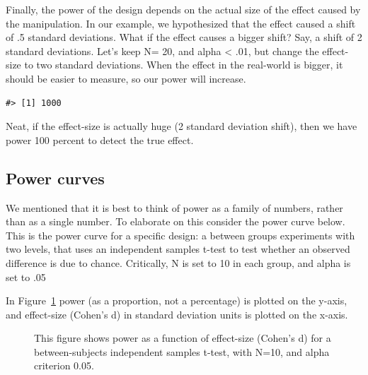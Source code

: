 \documentclass[
  letterpaper,
  DIV=11,
  numbers=noendperiod]{scrreprt}
\begin{document}
Finally, the power of the design depends on the actual size of the
effect caused by the manipulation. In our example, we hypothesized that
the effect caused a shift of .5 standard deviations. What if the effect
causes a bigger shift? Say, a shift of 2 standard deviations. Let's keep
N= 20, and alpha \textless{} .01, but change the effect-size to two
standard deviations. When the effect in the real-world is bigger, it
should be easier to measure, so our power will increase.

\begin{verbatim}
#> [1] 1000
\end{verbatim}

Neat, if the effect-size is actually huge (2 standard deviation shift),
then we have power 100 percent to detect the true effect.

\subsection{Power curves}\label{power-curves-1}

We mentioned that it is best to think of power as a family of numbers,
rather than as a single number. To elaborate on this consider the power
curve below. This is the power curve for a specific design: a between
groups experiments with two levels, that uses an independent samples
t-test to test whether an observed difference is due to chance.
Critically, N is set to 10 in each group, and alpha is set to .05

In Figure~\ref{fig-13powercurve} power (as a proportion, not a
percentage) is plotted on the y-axis, and effect-size (Cohen's d) in
standard deviation units is plotted on the x-axis.

\begin{figure}


\caption{\label{fig-13powercurve}This figure shows power as a function
of effect-size (Cohen's d) for a between-subjects independent samples
t-test, with N=10, and alpha criterion 0.05.}

\end{figure}%
\end{document}
